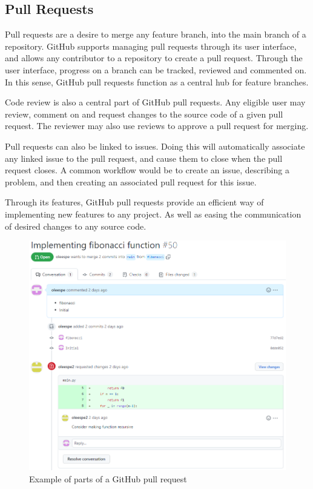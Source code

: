 \subsection{Pull Requests}

Pull requests are a desire to merge any feature branch, into the main branch of a repository.
GitHub supports managing pull requests through its user interface, and allows any contributor to a repository to create a pull request.
Through the user interface, progress on a branch can be tracked, reviewed and commented on.
In this sense, GitHub pull requests function as a central hub for feature branches.

Code review is also a central part of GitHub pull requests.
Any eligible user may review, comment on and request changes to the source code of a given pull request.
The reviewer may also use reviews to approve a pull request for merging.

Pull requests can also be linked to issues.
Doing this will automatically associate any linked issue to the pull request, and cause them to close when the pull request closes.
A common workflow would be to create an issue, describing a problem, and then creating an associated pull request for this issue.

Through its features, GitHub pull requests provide an efficient way of implementing new features to any project.
As well as easing the communication of desired changes to any source code.

\begin{figure}[ht]
    \centering
    \includegraphics[width=\textwidth]{photos/pull-request.PNG}
    \caption{Example of parts of a GitHub pull request}
    \label{fig:pull-request}
\end{figure}

